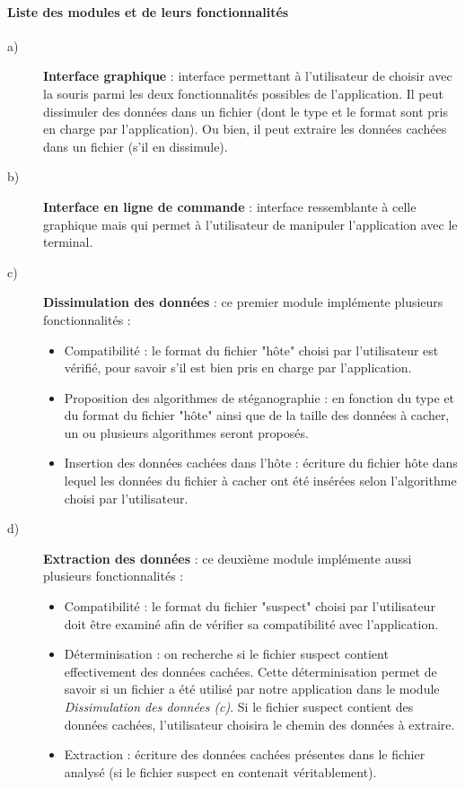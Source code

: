 \documentclass[11pt]{article}
\begin{document}
\paragraph{Liste des modules et de leurs fonctionnalités}
\begin{description}
\item[a)] \textbf{Interface graphique} : interface permettant à l'utilisateur de choisir avec la souris parmi les deux fonctionnalités possibles de l'application. 
Il peut dissimuler des données dans un fichier (dont le type et le format sont pris en charge par l'application). Ou bien, il peut extraire les données cachées dans un fichier (s'il en dissimule). 

\item[b)] \textbf{Interface en ligne de commande} : interface ressemblante à celle graphique mais qui permet à l'utilisateur de manipuler l'application avec le terminal. 

\item[c)] \textbf{Dissimulation des données} : ce premier module implémente plusieurs fonctionnalités : 
\begin{itemize}
\item Compatibilité : le format du fichier "hôte" choisi par l'utilisateur est vérifié, pour savoir s'il est bien pris en charge par l'application. 
\item Proposition des algorithmes de stéganographie : en fonction du type et du format du fichier "hôte" ainsi que de la taille des données à cacher, un ou plusieurs algorithmes seront proposés. 
\item Insertion des données cachées dans l'hôte : écriture du fichier hôte dans lequel les données du fichier à cacher ont été insérées selon l'algorithme choisi par l'utilisateur. 
\end{itemize}

\item[d)] \textbf{Extraction des données} : ce deuxième module implémente aussi plusieurs fonctionnalités : 
\begin{itemize}
\item Compatibilité : le format du fichier "suspect" choisi par l'utilisateur doit être examiné afin de vérifier sa compatibilité avec l'application. 
\item Déterminisation : on recherche si le fichier suspect contient effectivement des données cachées. Cette déterminisation permet de savoir si un 
fichier a été utilisé par notre application dans le module \textit{Dissimulation des données (c)}.
Si le fichier suspect contient des données cachées, l'utilisateur choisira le chemin des données à extraire.
\item Extraction : écriture des données cachées présentes dans le fichier analysé (si le fichier suspect en contenait véritablement). 
\end{itemize}

\end{description}
\end{document}
